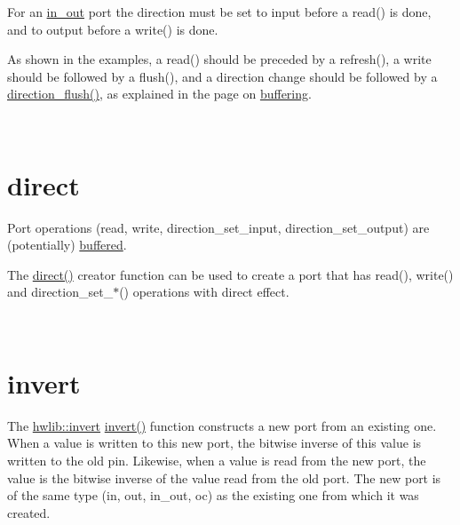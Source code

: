 \begin{DoxyCodeInclude}
\end{DoxyCodeInclude}

\begin{DoxyCodeInclude}
\end{DoxyCodeInclude}
 For an \hyperlink{classhwlib_1_1port__in__out}{in\+\_\+out} port the direction must be set to input before a read() is done, and to output before a write() is done.


\begin{DoxyCodeInclude}
\end{DoxyCodeInclude}
 As shown in the examples, a read() should be preceded by a refresh(), a write should be followed by a flush(), and a direction change should be followed by a \hyperlink{classhwlib_1_1port__in__out_a431b79eee48a21a93978bfdf6620f800}{direction\+\_\+flush()}, as explained in the page on \hyperlink{buffering}{buffering}.

~\newline
 

\hypertarget{ports_port-direct}{}\section{direct}\label{ports_port-direct}
Port operations (read, write, direction\+\_\+set\+\_\+input, direction\+\_\+set\+\_\+output) are (potentially) \hyperlink{buffering}{buffered}.

The \hyperlink{namespacehwlib_a43941b7f246ad934ee43dbfa0f5c8b5a}{direct()} creator function can be used to create a port that has read(), write() and direction\+\_\+set\+\_\+$\ast$() operations with direct effect.


\begin{DoxyCodeInclude}
\end{DoxyCodeInclude}
 ~\newline
 

\hypertarget{ports_port-invert}{}\section{invert}\label{ports_port-invert}
The \hyperlink{namespacehwlib_ab619d7f70bb62112b2a04192f5103a24}{hwlib\+::invert} \hyperlink{namespacehwlib_ab619d7f70bb62112b2a04192f5103a24}{invert()} function constructs a new port from an existing one. When a value is written to this new port, the bitwise inverse of this value is written to the old pin. Likewise, when a value is read from the new port, the value is the bitwise inverse of the value read from the old port. The new port is of the same type (in, out, in\+\_\+out, oc) as the existing one from which it was created.


